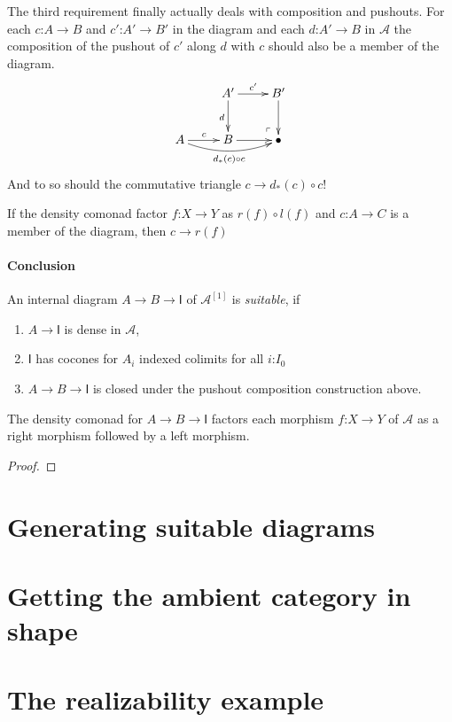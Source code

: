 \documentclass{tac}
\makeatletter
\newcommand\hide[1]{}
\newcommand\cat\mathcal
\newcommand\icat\mathsf
\newcommand\of{\mathord:}
\newcommand\pushed{\ar@{}[ul]|(.2)\ulcorner}
\makeatother
\begin{document}
The third requirement finally actually deals with composition and pushouts. For each $c\of A\to B$ and $c'\of A'\to B'$ in the diagram and each $d\of A'\to B$ in $\cat A$ the composition of the pushout of $c'$ along $d$ with $c$ should also be a member of the diagram.
\[\xymatrix{
& A'\ar[r]^{c'}\ar[d]_d & B'\ar[d] \\
A\ar[r]^c\ar@/_2ex/[rr]_{d_*(c)\circ c} & B \ar[r] & \bullet\pushed
}\]
And to so should the commutative triangle $c\to d_*(c)\circ c$!

If the density comonad factor $f\of X\to Y$ as $r(f)\circ l(f)$ and $c\of A\to C$ is a member of the diagram, then $c\to r(f)$ 

\paragraph{Conclusion}

\begin{definition}
An internal diagram $A\to B \to \icat I$ of $\cat A^{[1]}$ is \emph{suitable}, if 
\begin{enumerate}
\item $A\to\icat I$ is dense in $\cat A$, 
\item $\icat I$ has cocones for $A_i$ indexed colimits for all $i\of I_0$
\item $A\to B \to \icat I$ is closed under the pushout composition construction above.
\end{enumerate}
\end{definition}


\begin{lemma} The density comonad for $A\to B \to \icat I$ factors each morphism $f\of X\to Y$ of $\cat A$ as a right morphism followed by a left morphism. %
\end{lemma}

\begin{proof} %
\end{proof}


\hide{
collect requirements:
- lccc for the internalized density comonads
- pushouts
- internalized smallness
}

\section{Generating suitable diagrams}

\section{Getting the ambient category in shape}
\hide{
- nno's cycles & horns
- W-types
-	etc.
}

\section{The realizability example}
\hide{
- simplicial assemblies & modest sets.
- exact completions for pushouts.
- exact completions as examples of homotopy categories.
}
\end{document}
